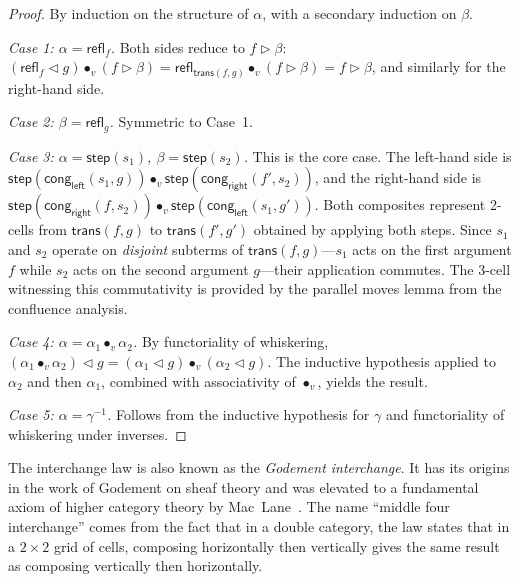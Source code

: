 \documentclass[manuscript]{BSLstyle}
\newcommand{\refl}{\mathsf{refl}}
\newcommand{\trans}{\mathsf{trans}}
\begin{document}
\begin{proof}
By induction on the structure of $\alpha$, with a secondary induction
on $\beta$.

\emph{Case 1: $\alpha = \refl_f$.}
Both sides reduce to $f \triangleright \beta$:
$(\refl_f \triangleleft g) \bullet_v (f \triangleright \beta)
= \refl_{\trans(f,g)} \bullet_v (f \triangleright \beta)
= f \triangleright \beta$,
and similarly for the right-hand side.

\emph{Case 2: $\beta = \refl_g$.}
Symmetric to Case~1.

\emph{Case 3: $\alpha = \mathsf{step}(s_1)$, $\beta = \mathsf{step}(s_2)$.}
This is the core case.  The left-hand side is
$\mathsf{step}(\mathsf{cong}_{\mathsf{left}}(s_1, g)) \bullet_v
\mathsf{step}(\mathsf{cong}_{\mathsf{right}}(f', s_2))$,
and the right-hand side is
$\mathsf{step}(\mathsf{cong}_{\mathsf{right}}(f, s_2)) \bullet_v
\mathsf{step}(\mathsf{cong}_{\mathsf{left}}(s_1, g'))$.
Both composites represent 2-cells from $\trans(f, g)$ to $\trans(f', g')$
obtained by applying both steps.  Since $s_1$ and $s_2$ operate on
\emph{disjoint} subterms of $\trans(f, g)$---$s_1$ acts on the first
argument $f$ while $s_2$ acts on the second argument $g$---their
application commutes.  The 3-cell witnessing this commutativity is
provided by the parallel moves lemma from the confluence analysis.

\emph{Case 4: $\alpha = \alpha_1 \bullet_v \alpha_2$.}
By functoriality of whiskering,
$(\alpha_1 \bullet_v \alpha_2) \triangleleft g
= (\alpha_1 \triangleleft g) \bullet_v (\alpha_2 \triangleleft g)$.
The inductive hypothesis applied to $\alpha_2$ and then $\alpha_1$,
combined with associativity of $\bullet_v$, yields the result.

\emph{Case 5: $\alpha = \gamma^{-1}$.}
Follows from the inductive hypothesis for $\gamma$ and functoriality
of whiskering under inverses.
\end{proof}

\begin{remark}
The interchange law is also known as the \emph{Godement interchange}.
It has its origins in the work of Godement on sheaf theory and was
elevated to a fundamental axiom of higher category theory by
Mac~Lane~\cite{MacLane98}.  The name ``middle four interchange'' comes
from the fact that in a double category, the law states that in a
$2 \times 2$ grid of cells, composing horizontally then vertically gives
the same result as composing vertically then horizontally.
\end{remark}
\end{document}
